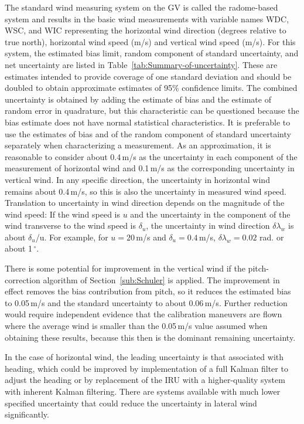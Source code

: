 \documentclass[12pt,twoside,english]{article}\usepackage[]{graphicx}\usepackage[]{color}
\let\OrgIndex\index
\renewcommand*{\index}[1]{\OrgIndex{#1}}
\begin{document}
The standard wind measuring system on the GV is called the radome-based system and results in the basic wind measurements with variable names WDC, WSC, and WIC representing the horizontal wind direction (degrees relative to true north), horizontal wind speed (m/s) and vertical wind speed (m/s). For this system, the estimated bias limit, random component of standard uncertainty, and net uncertainty are listed in Table~\ref{tab:Summary-of-uncertainty}. These are estimates intended to provide coverage of one standard deviation and should be doubled to obtain approximate estimates of 95\% confidence limits. The combined uncertainty is obtained by adding the estimate of bias and the estimate of random error in quadrature, but this characteristic can be questioned because the bias estimate does not have normal statistical characteristics. It is preferable to use the estimates of bias and of the random component of standard uncertainty separately when characterizing a measurement. As an approximation, it is reasonable to consider about 0.4\,m/s as the uncertainty in each component of the measurement of horizontal wind and 0.1\,m/s as the corresponding uncertainty in vertical wind. In any specific direction, the uncertainty in horizontal wind remains about 0.4\,m/s, so this is also the uncertainty in measured wind speed. Translation to uncertainty in wind direction depends on the magnitude of the wind speed: If the wind speed is $u$ and the uncertainty in the component of the wind transverse to the wind speed is $\delta_{u}$, the uncertainty in wind direction $\delta\lambda_w$ is about $\delta_{u}$/u. For example, for $u=20$\,m/s and $\delta_{u}=0.4$\,m/s, $\delta\lambda_w=0.02$ rad. or about 1\,$^{\circ}$. 

There is some potential for improvement in the vertical wind if the pitch-correction algorithm of Section{~}\ref{sub:Schuler} is applied. The improvement in effect removes the bias contribution from pitch, so it reduces the estimated bias to 0.05\,m/s and the standard uncertainty to about 0.06\,m/s. Further reduction would require independent evidence that the calibration maneuvers are flown where the average wind is smaller than the 0.05\,m/s value assumed when obtaining these results, because this then is the dominant remaining uncertainty. 

In the case of horizontal wind, the leading uncertainty is that associated with heading, which could be improved by implementation of a full Kalman filter to adjust the heading or by replacement of the IRU with a higher-quality system with inherent Kalman filtering. There are systems available with much lower specified uncertainty that could reduce the uncertainty in lateral wind significantly. 
\end{document}
